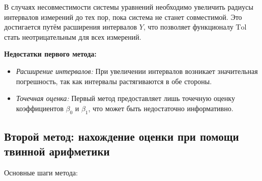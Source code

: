\documentclass[a4paper,14pt]{extarticle}
\begin{document}
В случаях несовместимости системы уравнений необходимо увеличить радиусы интервалов измерений до тех пор, пока система не станет совместимой. Это достигается путём расширения интервалов $ Y $, что позволяет функционалу $\text{Tol}$ стать неотрицательным для всех измерений.

\textbf{Недостатки первого метода:}
\begin{itemize}
    \item \textit{Расширение интервалов:} При увеличении интервалов возникает значительная погрешность, так как интервалы растягиваются в обе стороны.
    \item \textit{Точечная оценка:} Первый метод предоставляет лишь точечную оценку коэффициентов $ \beta_0 $ и $ \beta_1 $, что может быть недостаточно информативно.
\end{itemize}

\subsection{Второй метод: нахождение оценки при помощи твинной арифметики}

Основные шаги метода:
\end{document}
